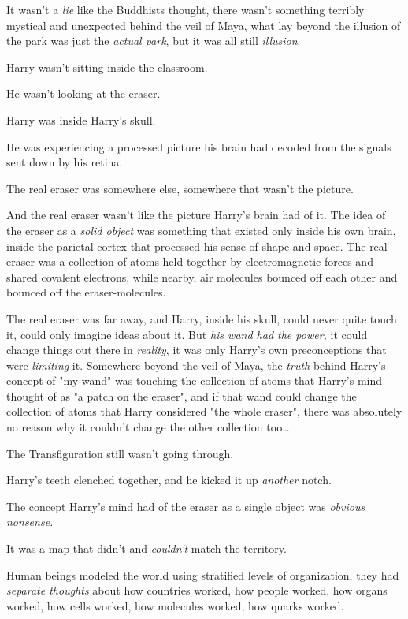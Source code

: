 It wasn't a \emph{lie} like the Buddhists thought, there wasn't something 
terribly mystical and unexpected behind the veil of Maya, what lay beyond the 
illusion of the park was just the \emph{actual park}, but it was all still 
\emph{illusion}.

Harry wasn't sitting inside the classroom.

He wasn't looking at the eraser.

Harry was inside Harry's skull.

He was experiencing a processed picture his brain had decoded from the signals 
sent down by his retina.

The real eraser was somewhere else, somewhere that wasn't the picture.

And the real eraser wasn't like the picture Harry's brain had of it. The idea 
of the eraser as a \emph{solid object} was something that existed only inside 
his own brain, inside the parietal cortex that processed his sense of shape and 
space. The real eraser was a collection of atoms held together by 
electromagnetic forces and shared covalent electrons, while nearby, air 
molecules bounced off each other and bounced off the eraser-molecules.

The real eraser was far away, and Harry, inside his skull, could never quite 
touch it, could only imagine ideas about it. But \emph{his wand had the power,} 
it could change things out there in \emph{reality}, it was only Harry's own 
preconceptions that were \emph{limiting} it. Somewhere beyond the veil of Maya, 
the \emph{truth} behind Harry's concept of "my wand" was touching the 
collection of atoms that Harry's mind thought of as "a patch on the eraser", 
and if that wand could change the collection of atoms that Harry considered 
"the whole eraser", there was absolutely no reason why it couldn't change the 
other collection too{\ldots}

The Transfiguration still wasn't going through.

Harry's teeth clenched together, and he kicked it up \emph{another} notch.

The concept Harry's mind had of the eraser as a single object was \emph{obvious 
nonsense.}

It was a map that didn't and \emph{couldn't} match the territory.

Human beings modeled the world using stratified levels of organization, they 
had \emph{separate thoughts} about how countries worked, how people worked, how 
organs worked, how cells worked, how molecules worked, how quarks worked.

